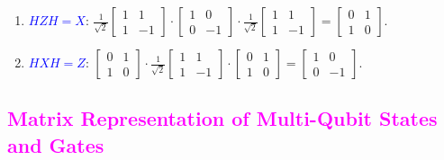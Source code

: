 \documentclass{book}
\begin{document}
\begin{enumerate}
    \item \textcolor{blue}{$HZH = X$}: \(\frac{1}{\sqrt{2}} \begin{bmatrix} 1 & 1 \\ 1 & -1 \end{bmatrix} \cdot \begin{bmatrix} 1 & 0 \\ 0 & -1 \end{bmatrix} \cdot \frac{1}{\sqrt{2}} \begin{bmatrix} 1 & 1 \\ 1 & -1 \end{bmatrix} = \begin{bmatrix} 0 & 1 \\ 1 & 0 \end{bmatrix}\).
    \item \textcolor{blue}{$HXH = Z$}: \(\begin{bmatrix} 0 & 1 \\ 1 & 0 \end{bmatrix} \cdot \frac{1}{\sqrt{2}} \begin{bmatrix} 1 & 1 \\ 1 & -1 \end{bmatrix} \cdot \begin{bmatrix} 0 & 1 \\ 1 & 0 \end{bmatrix} = \begin{bmatrix} 1 & 0 \\ 0 & -1 \end{bmatrix}\).
\end{enumerate}
\textcolor{magenta}{\section{\textbf{Matrix Representation of Multi-Qubit States and Gates}}}
\end{document}
